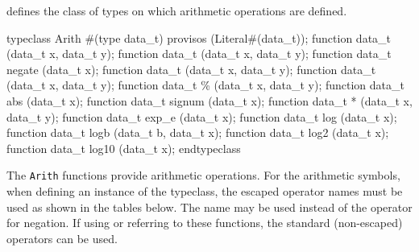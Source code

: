  defines the class of types on which arithmetic operations are defined.

\begin{libverbatim}
   typeclass Arith #(type data_t)
     provisos (Literal#(data_t));
       function data_t \+ (data_t x, data_t y);
       function data_t \- (data_t x, data_t y);
       function data_t negate (data_t x);
       function data_t \* (data_t x, data_t y);
       function data_t \/ (data_t x, data_t y);
       function data_t \% (data_t x, data_t y);
       function data_t abs (data_t x);
       function data_t signum (data_t x);
       function data_t \** (data_t x, data_t y);
       function data_t exp_e (data_t x);
       function data_t log (data_t x);
       function data_t logb (data_t b, data_t x);
       function data_t log2 (data_t x); 
       function data_t log10 (data_t x);      
   endtypeclass
\end{libverbatim}
The {\tt Arith} functions provide arithmetic operations.  
For the arithmetic symbols, when defining an instance of the
 typeclass, the escaped operator names must be used as
shown in the tables below.  The  name may be used instead
of the operator for negation.   If using or referring to these
functions, the standard (non-escaped) {\V}
operators can be used.

